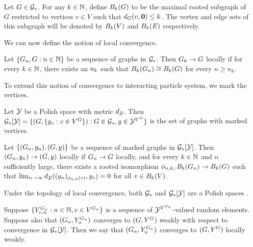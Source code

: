 \begin{defn}
Let \(G \in \Gs\). For any \(k \in \mb{N}\), define \(\trnc{k}(G)\) to be the maximal rooted subgraph of \(G\) restricted to vertices \(v \in V\) such that \(\met{G}{}(v,\root) \leq k\). The vertex and edge sets of this subgraph will be denoted by \(\trnc{k}(V)\) and \(\trnc{k}(E)\) respectively.
\label{lwc::trnc}
\end{defn}

We can now define the notion of local convergence.

\begin{defn}
Let \(\{G\it{n},G:n\in\mb{N}\}\) be a sequence of graphs in \(\Gs\). Then \(G\it{k} \ra G\) locally if for every \(k \in \mb{N}\), there exists an \(n\it{k}\) such that \(\trnc{k}(G\it{n}) \cong \trnc{k}(G)\) for every \(n \geq n_k\).
\label{lwc::lc}
\end{defn}

To extend this notion of convergence to interacting particle system, we mark the vertices.

\begin{defn}
Let \(\spce\) be a Polish space with metric \(\met{\spce}{}\). Then \(\Gs\sp{\spce} = \{(G,\{\xg\vind{v}:v \in V\gind{G}\}): G \in \Gs, \xg\in \spce^{V\gind{G}}\}\) is the set of graphs with marked vertices.
\label{lwc::marked}
\end{defn}

\begin{defn}
Let \(\{(G\it{n},\xg\it{n}),(G,\xg)\}\) be a sequence of marked graphs in \(\Gs\sp{\spce}\). Then \((G\it{n},\xg\it{n}) \ra (G,\xg)\) locally if \(G\it{n} \ra G\) locally, and for every \(k \in \mb{N}\) and \(n\) sufficiently large, there exists a rooted isomorphism \(\phi\dit{n,k}:\trnc{k}(G\it{n}) \ra \trnc{k}(G)\) such that \(\lim_{n\ra\infty} \met{\spce}{}((\xg\it{n})\vind{\phi\dit{n}{k}(v)},\xg\vind{v}) = 0\) for all \(v \in \trnc{k}(V)\).
\label{lwc::mlc}
\end{defn}

Under the topology of local convergence, both \(\Gs\) and \(\Gs\sp{\spce}\) are a Polish spaces \cite[Lemmas A.2, A.3, and A.5]{LacRamWu19}.

\begin{defn}
Suppose \(\{\Xg\gind{G\it{n}}\vindit{v}{n}:n\in\mb{N},v \in V\gind{G\it{n}}\}\) is a sequence of \(\spce^{V\gind{G\it{n}}}\)-valued random elements. Suppose also that \((G\it{n},\Xg\gind{G\it{n}}\it{n})\) converges to \((G,\Xg\gind{G})\) weakly with respect to convergence in \(\Gs\sp{\spce}\). Then we say that \((G\it{n},\Xg\gind{G\it{n}}\it{n})\) converges to \((G,\Xg\gind{G})\) locally weakly.
\label{lwc::lwc}
\end{defn}

